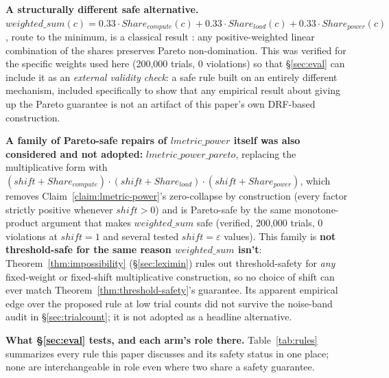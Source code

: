\documentclass[sigconf,review,anonymous]{acmart}
\begin{document}
\textbf{A structurally different safe alternative.} $\mathit{weighted\_sum}(c) =
0.33 \cdot \mathit{Share_{compute}}(c) + 0.33 \cdot \mathit{Share_{load}}(c) + 0.33 \cdot
\mathit{Share_{power}}(c)$, route to the minimum, is a classical result
\cite{geoffrion1968proper}: any positive-weighted linear combination of the shares preserves
Pareto non-domination. This was verified for the specific weights used here (200{,}000
trials, 0 violations) so that \S\ref{sec:eval} can include it as an \emph{external validity
check}: a safe rule built on an entirely different mechanism, included specifically to show
that any empirical result about giving up the Pareto guarantee is not an artifact of this
paper's own DRF-based construction.

\textbf{A family of Pareto-safe repairs of $\mathit{lmetric\_power}$ itself was also
considered and not adopted:} $\mathit{lmetric\_power\_pareto}$, replacing the
multiplicative form with $(\mathit{shift} + \mathit{Share_{compute}}) \cdot
(\mathit{shift} + \mathit{Share_{load}}) \cdot (\mathit{shift} + \mathit{Share_{power}})$,
which removes Claim~\ref{claim:lmetric-power}'s zero-collapse by construction (every factor
strictly positive whenever $\mathit{shift} > 0$) and is Pareto-safe by the same
monotone-product argument that makes $\mathit{weighted\_sum}$ safe (verified, 200{,}000
trials, 0 violations at $\mathit{shift}{=}1$ and several tested $\mathit{shift}{=}\varepsilon$
values). This family is \textbf{not threshold-safe for the same reason $\mathit{weighted\_sum}$
isn't}: Theorem~\ref{thm:impossibility} (\S\ref{sec:leximin}) rules out threshold-safety for
\emph{any} fixed-weight or fixed-shift multiplicative construction, so no choice of shift can
ever match Theorem~\ref{thm:threshold-safety}'s guarantee. Its apparent empirical edge over
the proposed rule at low trial counts did not survive the noise-band audit in
\S\ref{sec:trialcount}; it is not adopted as a headline alternative.

\textbf{What \S\ref{sec:eval} tests, and each arm's role there.} Table~\ref{tab:rules}
summarizes every rule this paper discusses and its safety status in one place; none are
interchangeable in role even where two share a safety guarantee.
\end{document}
